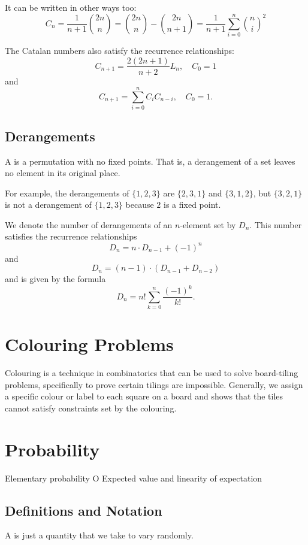 It can be written in other ways too:
\[ C_n=\frac{1}{n+1}\binom{2n}{n}=\binom{2n}{n}-\binom{2n}{n+1}=\frac{1}{n+1}\sum_{i=0}^n\binom{n}{i}^2 \]

The Catalan numbers also satisfy the recurrence relationships:
\[ C_{n+1}=\frac{2(2n+1)}{n+2}L_n, \quad C_0=1 \]
and
\[ C_{n+1}=\sum_{i=0}^nC_iC_{n-i}, \quad C_0=1. \]

\subsection{Derangements}
A  is a permutation with no fixed points. That is, a derangement of a set leaves no element in its original place.

\begin{example}
For example, the derangements of $\{1,2,3\}$ are $\{2, 3, 1\}$ and $\{3, 1, 2\}$, but $\{3,2, 1\}$ is not a derangement of $\{1,2,3\}$ because $2$ is a fixed point.
\end{example}

We denote the number of derangements of an $n$-element set by $D_n$. This number satisfies the recurrence relationships
\[D_n=n\cdot D_{n-1}+(-1)^n\]
and
\[D_n=(n-1)\cdot(D_{n - 1}+D_{n-2})\]
and is given by the formula \[D_n = n! \sum_{k=0}^{n} \frac{(-1)^k}{k!}.\]
\pagebreak

\section{Colouring Problems}
Colouring is a technique in combinatorics that can be used to solve board-tiling problems, specifically to prove certain tilings are impossible. Generally, we assign a specific colour or label to each square on a board and shows that the tiles cannot satisfy constraints set by the colouring.


\pagebreak

\section{Probability}
Elementary probability
O Expected value and linearity of expectation
\subsection{Definitions and Notation}
A  is just a quantity that we take to vary randomly.


